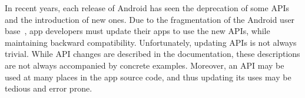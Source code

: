 In recent years, each release of Android has seen the deprecation of some
APIs and the introduction of new ones.  Due to the fragmentation of the
Android user base~\cite{he2018understanding,li2018cid}, app developers must update their apps to use the new
APIs, while maintaining backward compatibility.  Unfortunately, updating
APIs is not always trivial.  While API changes are described in the
documentation, these descriptions are not always accompanied by concrete
examples.  Moreover, an API may be used at many places in the app source
code, and thus updating its uses may be tedious and error prone.




